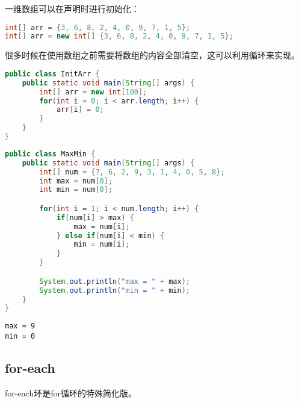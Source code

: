 一维数组可以在声明时进行初始化：

\vspace{-0.5cm}

\begin{lstlisting}[language=Java]
int[] arr = {3, 6, 8, 2, 4, 0, 9, 7, 1, 5};
int[] arr = new int[] {3, 6, 8, 2, 4, 0, 9, 7, 1, 5};
\end{lstlisting}

很多时候在使用数组之前需要将数组的内容全部清空，这可以利用循环来实现。\\


\begin{lstlisting}[language=Java]
public class InitArr {
    public static void main(String[] args) {
        int[] arr = new int[100];
        for(int i = 0; i < arr.length; i++) {
            arr[i] = 0;
        }
    }
}
\end{lstlisting}

\vspace{0.5cm}


\begin{lstlisting}[language=Java]
public class MaxMin {
    public static void main(String[] args) {
        int[] num = {7, 6, 2, 9, 3, 1, 4, 0, 5, 8};
        int max = num[0];
        int min = num[0];

        for(int i = 1; i < num.length; i++) {
            if(num[i] > max) {
                max = num[i];
            } else if(num[i] < min) {
                min = num[i];
            }
        }

        System.out.println("max = " + max);
        System.out.println("min = " + min);
    }
}
\end{lstlisting}

\begin{tcolorbox}
	\begin{verbatim}
max = 9
min = 0
	\end{verbatim}
\end{tcolorbox}

\vspace{0.5cm}

\subsection{for-each}

for-each环是for循环的特殊简化版。

